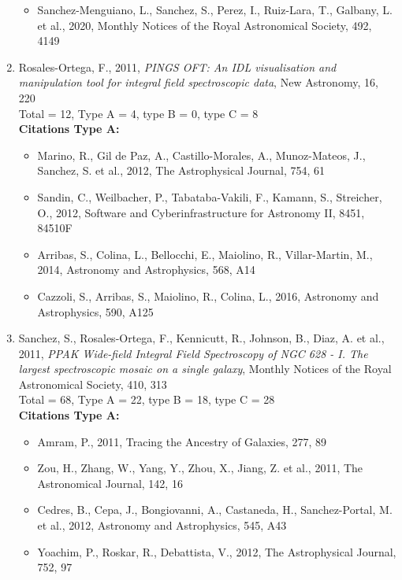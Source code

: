 \documentclass{letter}
\begin{document}
\begin{enumerate}
\begin{itemize}
\item Sanchez-Menguiano, L., Sanchez, S., Perez, I., Ruiz-Lara, T., Galbany, L. et al., 2020, Monthly Notices of the Royal Astronomical Society, 492, 4149
\end{itemize}
\item Rosales-Ortega, F., 2011, {\it PINGS OFT: An IDL visualisation and manipulation tool for integral field spectroscopic data}, New Astronomy, 16, 220 \\ 
Total = 12, Type A = 4, type B = 0, type C = 8 \\ 
{\bf Citations Type A:}
\begin{itemize}
\item Marino, R., Gil de Paz, A., Castillo-Morales, A., Munoz-Mateos, J., Sanchez, S. et al., 2012, The Astrophysical Journal, 754, 61
\item Sandin, C., Weilbacher, P., Tabataba-Vakili, F., Kamann, S., Streicher, O., 2012, Software and Cyberinfrastructure for Astronomy II, 8451, 84510F
\item Arribas, S., Colina, L., Bellocchi, E., Maiolino, R., Villar-Martin, M., 2014, Astronomy and Astrophysics, 568, A14
\item Cazzoli, S., Arribas, S., Maiolino, R., Colina, L., 2016, Astronomy and Astrophysics, 590, A125
\end{itemize}
\item Sanchez, S., Rosales-Ortega, F., Kennicutt, R., Johnson, B., Diaz, A. et al., 2011, {\it PPAK Wide-field Integral Field Spectroscopy of NGC 628 - I. The largest spectroscopic mosaic on a single galaxy}, Monthly Notices of the Royal Astronomical Society, 410, 313 \\ 
Total = 68, Type A = 22, type B = 18, type C = 28 \\ 
{\bf Citations Type A:}
\begin{itemize}
\item Amram, P., 2011, Tracing the Ancestry of Galaxies, 277, 89
\item Zou, H., Zhang, W., Yang, Y., Zhou, X., Jiang, Z. et al., 2011, The Astronomical Journal, 142, 16
\item Cedres, B., Cepa, J., Bongiovanni, A., Castaneda, H., Sanchez-Portal, M. et al., 2012, Astronomy and Astrophysics, 545, A43
\item Yoachim, P., Roskar, R., Debattista, V., 2012, The Astrophysical Journal, 752, 97

\end{itemize}
\end{enumerate}
\end{document}
